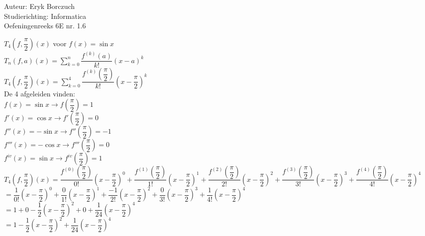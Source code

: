 \documentclass[a4paper]{article}
\begin{document}
  
\noindent \large Auteur: Eryk Borczuch \\
\noindent \large Studierichting: Informatica\\
\noindent \large Oefeningenreeks 6E nr. 1.6\\

\medskip

\normalsize

$T_4 \left( f , \dfrac{\pi}{2} \right)(x)$ voor $f(x) = \sin{x}$ \\

$T_n(f , a)(x) = \displaystyle \sum_{k = 0}^{n} \dfrac{f^{(k)}(a)}{k!}(x - a)^k$ \\

$T_4 \left( f , \dfrac{\pi}{2} \right)(x) = \displaystyle \sum_{k = 0}^{4} \dfrac{f^{(k)} \left( \dfrac{\pi}{2} \right)}{k!} \left( x - \dfrac{\pi}{2} \right)^k$ \\

De 4 afgeleiden vinden:\\

$f(x) = \sin x \rightarrow f \left( \dfrac{\pi}{2} \right) = 1$ \\

$f'(x) = \cos x \rightarrow f' \left( \dfrac{\pi}{2} \right) = 0$ \\

$f''(x) = - \sin x \rightarrow f'' \left( \dfrac{\pi}{2} \right) = -1$ \\

$f'''(x) = - \cos x \rightarrow f''' \left( \dfrac{\pi}{2} \right) = 0$ \\

$f^{iv}(x) = \sin x \rightarrow f^{iv} \left( \dfrac{\pi}{2} \right) = 1$ \\

$T_4 \left( f , \dfrac{\pi}{2} \right)(x) = \dfrac{f^{(0)} \left( \dfrac{\pi}{2} \right)}{0!} \left( x - \dfrac{\pi}{2} \right)^0 + \dfrac{f^{(1)} \left( \dfrac{\pi}{2} \right)}{1!} \left( x - \dfrac{\pi}{2} \right)^1 + \dfrac{f^{(2)} \left( \dfrac{\pi}{2} \right)}{2!} \left( x - \dfrac{\pi}{2} \right)^2 + \dfrac{f^{(3)} \left( \dfrac{\pi}{2} \right)}{3!} \left( x - \dfrac{\pi}{2} \right)^3 + \dfrac{f^{(4)} \left( \dfrac{\pi}{2} \right)}{4!} \left( x - \dfrac{\pi}{2} \right)^4$ \\
 
$= \dfrac{1}{0!} \left( x - \dfrac{\pi}{2} \right)^0 + \dfrac{0}{1!} \left( x - \dfrac{\pi}{2} \right)^1 + \dfrac{-1}{2!} \left( x - \dfrac{\pi}{2} \right)^2 + \dfrac{0}{3!} \left( x - \dfrac{\pi}{2} \right)^3 + \dfrac{1}{4!} \left( x - \dfrac{\pi}{2} \right)^4$ \\
 
$= 1 + 0 - \dfrac{1}{2} \left( x - \dfrac{\pi}{2} \right)^2 + 0 + \dfrac{1}{24} \left( x - \dfrac{\pi}{2} \right)^4$ \\
 
$= 1 - \dfrac{1}{2} \left( x - \dfrac{\pi}{2} \right)^2 + \dfrac{1}{24} \left( x - \dfrac{\pi}{2} \right)^4$ \\



\begin{thebibliography}{999}
\end{thebibliography}
\end{document}
